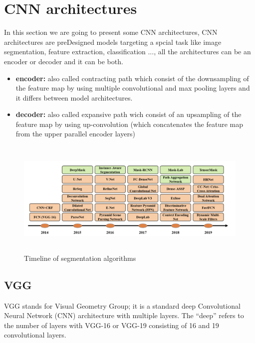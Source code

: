 \section{CNN architectures}
\vspace{0.2in}
\hspace*{0.16in}

In this section we are going to present some CNN architectures, CNN architectures are preDesigned models targeting a spcial task like image segmentation, feature extraction, classification ..., all the architectures can be an encoder or decoder and it can be both.
\begin{itemize}
    \item \textbf{encoder:} also called contracting path which consist of the downsampling of the feature map by using multiple convolutional and max pooling layers and it differs between model architectures.
    \item \textbf{decoder:} also called expansive path wich consist of an upsampling of the feature map by using up-convolution (which concatenates the feature map from the upper parallel encoder layers)
\end{itemize}

\begin{figure}[h]
    \centering
      \vspace{-0.1in}
        \centerline{\includegraphics[width = 6in, height = 2.2in]{../images/timeline-of-segmentation-algorithms.png}}
        \caption{Timeline of segmentation algorithms}
    \end{figure}


\subsection{VGG}
VGG stands for Visual Geometry Group; it is a standard deep Convolutional Neural Network (CNN) architecture with multiple layers. The “deep” refers to the number of layers with VGG-16 or VGG-19 consisting of 16 and 19 convolutional layers.\\

